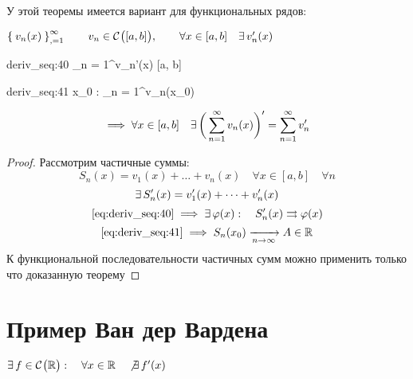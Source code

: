 У этой теоремы имеется вариант для функциональных рядов:

\begin{theorem}
	$ \Set{v_n(x)}_{,=1}^{\infty} \qquad v_n \in \mathcal{C}^{} \big( {[a, b]} \big) , \qquad \forall x \in [a, b] \quad \exists\, v_n'(x) $
	\begin{equ}{deriv_seq:40}
		\sum_{n = 1}^\infty v_n'(x)  [a, b]
	\end{equ}
	\begin{equ}{deriv_seq:41}
		\exist x_0 \in [a, b] : \quad \sum_{n = 1}^\infty v_n(x_0) 
	\end{equ}
	$$ \implies \forall x \in [a, b] \quad \exists\, \bigg( \sum_{n = 1}^\infty v_n(x) \bigg)' = \sum_{n = 1}^\infty v_n' $$
\end{theorem}

\begin{proof}
	Рассмотрим частичные суммы:
	$$ S_n(x) = v_1(x) + \dots + v_n(x) \quad \forall x \in [a, b] \quad \forall n $$
	$$ \exists\, S_n'(x) = v_1'(x) + \dots + v_n'(x) $$
	$$ \eref{deriv_seq:40} \implies \exist \vphi(x) : \quad S_n'(x) \rightrightarrows \vphi(x) $$
	$$ \eref{deriv_seq:41} \implies S_n(x_0) \infarr{n} A \in \R $$
	К функциональной последовательности частичных сумм можно применить только что доказанную теорему
\end{proof}

\section{Пример Ван дер Вардена}

\begin{theorem}
	$ \exists\, f \in \mathcal{C}^{} \big( {\mathbb{R}} \big)  : \quad \forall x \in \mathbb{R} \quad \not\exists\, f'(x) $
\end{theorem}

